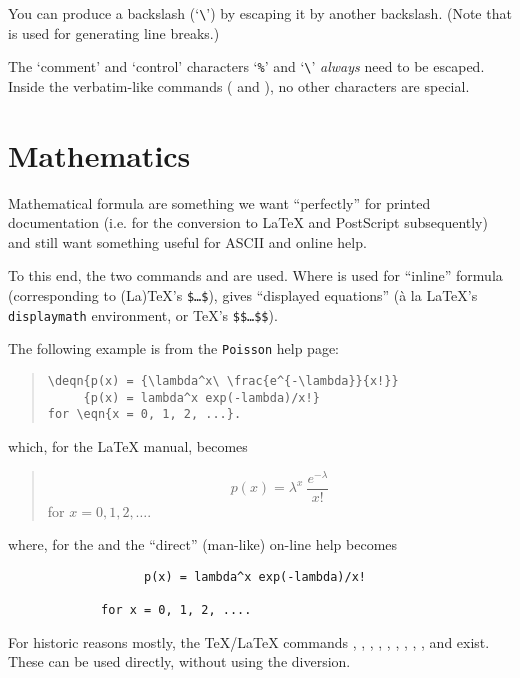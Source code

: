 You can produce a backslash (`\verb|\|') by escaping it by another
backslash.  (Note that  is used for generating line breaks.)

The `comment' and `control' characters `\texttt{\%}' and `\verb|\|'
\emph{always} need to be escaped.  Inside the verbatim-like commands
( and ), no other characters are special.

\section{Mathematics}

Mathematical formula are something we want ``perfectly'' for printed
documentation (i.e. for the conversion to \LaTeX{} and PostScript
subsequently) and still want something useful for ASCII and \HTML{}
online help.

To this end, the two commands
 and
 are used.  Where
 is used for ``inline'' formula (corresponding to (La)\TeX{}'s
\texttt{\$\ldots{}\$}),  gives ``displayed equations'' ({\`a} la
\LaTeX{}'s \texttt{displaymath} environment, or \TeX{}'s
\texttt{\$\$\ldots\$\$}).

The following example is from the \texttt{Poisson} help page:
\begin{quote}
\begin{verbatim}
\deqn{p(x) = {\lambda^x\ \frac{e^{-\lambda}}{x!}}
     {p(x) = lambda^x exp(-lambda)/x!}
for \eqn{x = 0, 1, 2, ...}.
\end{verbatim}
\end{quote}
which, for the \LaTeX{} manual, becomes
\begin{quote}
  \[ p(x) = \lambda^x\ \frac{e^{-\lambda}}{x!}  \]
  for $ x = 0, 1, 2, \ldots $.
\end{quote}
where, for the \HTML{} and the ``direct'' (man-like) on-line help
becomes
\begin{verbatim}
                   p(x) = lambda^x exp(-lambda)/x!
        
             for x = 0, 1, 2, ....
\end{verbatim}

For historic reasons mostly, the TeX/LaTeX commands ,
, , , , ,
, , ,  and  exist.
These can be used directly, without using the  diversion.

